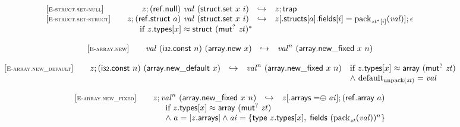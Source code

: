 \vspace{1ex}

$$
\begin{array}[t]{@{}lrcl@{}l@{}}
{[\textsc{\scriptsize E{-}struct.set{-}null}]} \quad & z ; (\mathsf{ref{.}null})~{\mathit{val}}~(\mathsf{struct{.}set}~x~i) & \hookrightarrow & z ; \mathsf{trap} \\
{[\textsc{\scriptsize E{-}struct.set{-}struct}]} \quad & z ; (\mathsf{ref{.}struct}~a)~{\mathit{val}}~(\mathsf{struct{.}set}~x~i) & \hookrightarrow & z{}[{.}\mathsf{structs}{}[a]{.}\mathsf{fields}{}[i] = {{\mathrm{pack}}}_{{{\mathit{zt}}^\ast}{}[i]}({\mathit{val}})] ; \epsilon &  \\
& \multicolumn{4}{@{}l@{}}{\quad
\quad \mbox{if}~ z{.}\mathsf{types}{}[x] \approx \mathsf{struct}~{({\mathsf{mut}^?}~{\mathit{zt}})^\ast}
} \\
\end{array}
$$

\vspace{1ex}

$$
\begin{array}[t]{@{}lrcl@{}l@{}}
{[\textsc{\scriptsize E{-}array.new}]} \quad & {\mathit{val}}~(\mathsf{i{\scriptstyle 32}}{.}\mathsf{const}~n)~(\mathsf{array{.}new}~x) & \hookrightarrow & {{\mathit{val}}^{n}}~(\mathsf{array{.}new\_fixed}~x~n) \\
\end{array}
$$

$$
\begin{array}[t]{@{}lrcl@{}l@{}}
{[\textsc{\scriptsize E{-}array.new\_default}]} \quad & z ; (\mathsf{i{\scriptstyle 32}}{.}\mathsf{const}~n)~(\mathsf{array{.}new\_default}~x) & \hookrightarrow & {{\mathit{val}}^{n}}~(\mathsf{array{.}new\_fixed}~x~n) & \quad
\begin{array}[t]{@{}l@{}}
\mbox{if}~ z{.}\mathsf{types}{}[x] \approx \mathsf{array}~({\mathsf{mut}^?}~{\mathit{zt}}) \\
{\land}~ {{\mathrm{default}}}_{{\mathrm{unpack}}({\mathit{zt}})} = {\mathit{val}} \\
\end{array} \\
\end{array}
$$

$$
\begin{array}[t]{@{}lrcl@{}l@{}}
{[\textsc{\scriptsize E{-}array.new\_fixed}]} \quad & z ; {{\mathit{val}}^{n}}~(\mathsf{array{.}new\_fixed}~x~n) & \hookrightarrow & z{}[{.}\mathsf{arrays} \mathrel{{=}{\oplus}} {\mathit{ai}}] ; (\mathsf{ref{.}array}~a) &  \\
& \multicolumn{4}{@{}l@{}}{\quad
\quad
\begin{array}[t]{@{}l@{}}
\mbox{if}~ z{.}\mathsf{types}{}[x] \approx \mathsf{array}~({\mathsf{mut}^?}~{\mathit{zt}}) \\
{\land}~ a = {|z{.}\mathsf{arrays}|} \land {\mathit{ai}} = \{ \mathsf{type}~z{.}\mathsf{types}{}[x],\;\allowbreak \mathsf{fields}~{({{\mathrm{pack}}}_{{\mathit{zt}}}({\mathit{val}}))^{n}} \} \\
\end{array}
} \\
\end{array}
$$

